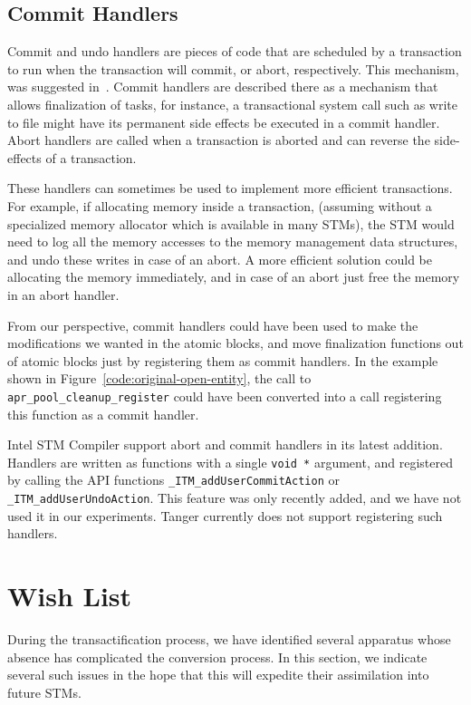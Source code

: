 \documentclass[preprint,11pt]{sigplanconf}
\let \cite = \citep
\begin{document}
\subsection{Commit Handlers}
Commit and undo handlers are pieces of code that are scheduled by a transaction
to run when the transaction will commit, or abort, respectively. This mechanism,
was suggested in~\cite{tm:commit-handlers}.  Commit handlers are described
there as a mechanism that allows finalization of tasks, for instance, a
transactional system call such as write to file might have its permanent side
effects be executed in a commit handler. 
Abort handlers are called when a transaction is aborted and can reverse the 
side-effects of a transaction. 

These handlers can sometimes be used to implement
more efficient transactions. For example, if allocating memory inside a
transaction, (assuming without a specialized memory allocator which is available
in many STMs), the STM would need to log all the memory accesses to the memory
management data structures, and undo these writes in case of an abort. A more
efficient solution could be allocating the memory immediately, and in case of an
abort just free the memory in an abort handler.

 From our perspective, commit handlers could have been used to make the
modifications we wanted in the atomic blocks, and move finalization functions
out of atomic blocks just by registering them as commit handlers. In the 
example shown in Figure~\ref{code:original-open-entity}, 
the call to {\tt apr\_pool\_cleanup\_register} could have been
converted into a call registering this function as a commit handler. 

Intel STM Compiler support abort and commit handlers in its latest addition.
Handlers are written as functions with a single {\tt void~*} argument, and
registered by calling the API functions {\tt \_ITM\_add\-User\-Commit\-Action} or
{\tt \_ITM\_add\-User\-Undo\-Action}. This feature was only recently added, and we have
not used it in our experiments. {\sc Tanger} currently does not support
registering such handlers.

\section{Wish List}\label{sec:wishlist} 

During the transactification process, we have identified several apparatus whose
absence has complicated the conversion process. In this section, we indicate
several such issues in the hope that this will expedite their assimilation into
future STMs.
\end{document}
